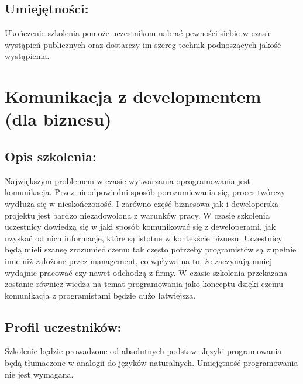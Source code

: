 \documentclass{article}[10pt]
\begin{document}
	\subsection*{Umiejętności:}
\begin{adjustwidth}{2cm}{}
\justifying
	
Ukończenie szkolenia pomoże uczestnikom nabrać pewności siebie w czasie wystąpień publicznych oraz dostarczy im szereg technik podnoszących jakość wystąpienia.


\end{adjustwidth}

\newpage


    
	\section{Komunikacja z developmentem (dla biznesu)}

	\subsection*{Opis szkolenia:}
	\begin{adjustwidth}{2cm}{}
\justifying
		
Największym problemem w czasie wytwarzania oprogramowania jest komunikacja. Przez nieodpowiedni sposób porozumiewania się, proces twórczy wydłuża się w nieskończoność. I zarówno część biznesowa jak i deweloperska projektu jest bardzo niezadowolona z warunków pracy.
W czasie szkolenia uczestnicy dowiedzą się w jaki sposób komunikować się z deweloperami, jak uzyskać od nich informacje, które są istotne w kontekście biznesu. 
Uczestnicy będą mieli szansę zrozumieć czemu tak często potrzeby programistów są zupełnie inne niż założone przez management, co wpływa na to, że zaczynają mniej wydajnie pracować czy nawet odchodzą z firmy. W czasie szkolenia przekazana zostanie również wiedza na temat programowania jako konceptu dzięki czemu komunikacja z programistami będzie dużo łatwiejsza.
	\end{adjustwidth}
	\subsection*{Profil uczestników:}
\begin{adjustwidth}{2cm}{}
\justifying
	Szkolenie będzie prowadzone od absolutnych podstaw. Języki programowania będą tłumaczone w analogii do języków naturalnych. Umiejętność programowania nie jest wymagana.
\end{adjustwidth}
\end{document}
